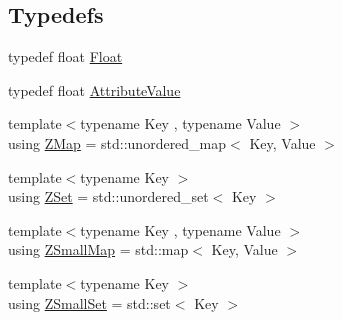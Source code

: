\subsection*{Typedefs}
\begin{DoxyCompactItemize}
\item 
typedef float \hyperlink{namespaceZeta_a1e0a1265f9b3bd3075fb0fabd39088ba}{Float}
\item 
typedef float \hyperlink{namespaceZeta_ab5947f98c0ab6302b51f8c6e93ec5581}{Attribute\+Value}
\item 
{\footnotesize template$<$typename Key , typename Value $>$ }\\using \hyperlink{namespaceZeta_a9af2e12c4e432d2a1725f19e5a648a04}{Z\+Map} = std\+::unordered\+\_\+map$<$ Key, Value $>$
\item 
{\footnotesize template$<$typename Key $>$ }\\using \hyperlink{namespaceZeta_a92c229b4db6ab7275c2b7f32bdfabc87}{Z\+Set} = std\+::unordered\+\_\+set$<$ Key $>$
\item 
{\footnotesize template$<$typename Key , typename Value $>$ }\\using \hyperlink{namespaceZeta_a4c11e23ddc559dccdb5e85901d7dfb84}{Z\+Small\+Map} = std\+::map$<$ Key, Value $>$
\item 
{\footnotesize template$<$typename Key $>$ }\\using \hyperlink{namespaceZeta_a44c717c98a964d0ebf6ea954cb9c91bf}{Z\+Small\+Set} = std\+::set$<$ Key $>$
\end{DoxyCompactItemize}

